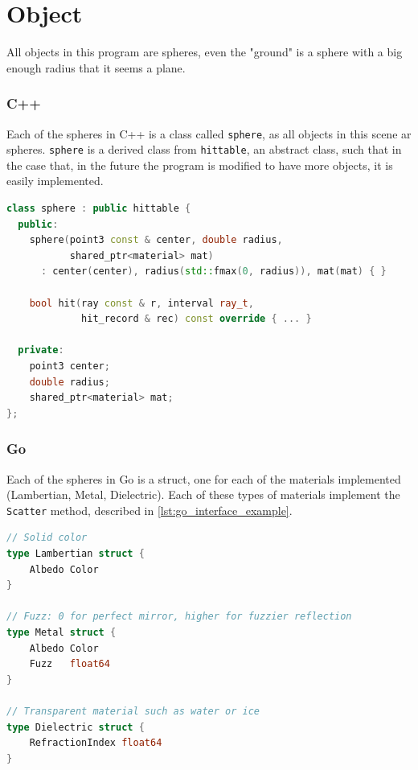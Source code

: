 

\section{Object}
All objects in this program are spheres, even the "ground" is a sphere with a big enough radius that it seems a plane.

\subsubsection{C++}
Each of the spheres in C++ is a class called \texttt{sphere}, as all objects in this scene ar spheres. \texttt{sphere} is a derived class from \texttt{hittable}, an abstract class, such that in the case that, in the future the program is modified to have more objects, it is easily implemented. 

\begin{lstlisting}[language=C++, caption={Sphere Class for C++}, label={lst:sphere_cpp}]
class sphere : public hittable {
  public:
    sphere(point3 const & center, double radius,
           shared_ptr<material> mat)
      : center(center), radius(std::fmax(0, radius)), mat(mat) { }

    bool hit(ray const & r, interval ray_t,
             hit_record & rec) const override { ... }

  private:
    point3 center;
    double radius;
    shared_ptr<material> mat;
};
\end{lstlisting}



\subsubsection{Go}
Each of the spheres in Go is a struct, one for each of the materials implemented (Lambertian, Metal, Dielectric). Each of these types of materials implement the \texttt{Scatter} method, described in \autoref{lst:go_interface_example}.

\begin{lstlisting}[language=Go, caption={Go materials structs.}, label={lst:go_materials_structs}]
// Solid color
type Lambertian struct {
	Albedo Color
}

// Fuzz: 0 for perfect mirror, higher for fuzzier reflection
type Metal struct {
	Albedo Color
	Fuzz   float64 
}

// Transparent material such as water or ice
type Dielectric struct {
	RefractionIndex float64
}
\end{lstlisting}



